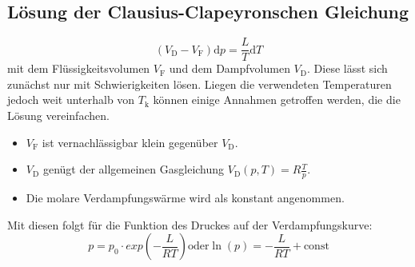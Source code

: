          \subsection{Lösung der Clausius-Clapeyronschen Gleichung}
         \begin{equation}
           (V_\text{D}-V_\text{F})\text{d}p = \frac{L}{T}\text{d}T \label{eq:DGL}
           \end{equation}
           mit dem Flüssigkeitsvolumen $V_\text{F}$ und dem Dampfvolumen $V_\text{D}$.
Diese lässt sich zunächst nur mit Schwierigkeiten lösen.
Liegen die verwendeten Temperaturen jedoch weit unterhalb von $T_\text{k}$ können
 einige Annahmen getroffen werden, die die Lösung vereinfachen.
\begin{itemize}
  \item $V_\text{F}$ ist vernachlässigbar klein gegenüber $V_\text{D}$.
  \item $V_\text{D}$ genügt der allgemeinen Gasgleichung $V_\text{D}(p,T) = R\frac{T}{p}$.
  \item Die molare Verdampfungswärme wird als konstant angenommen.
\end{itemize}
Mit diesen folgt für die Funktion des Druckes auf der Verdampfungskurve:
\begin{equation}
  p = p_0 \cdot exp \left(-\frac{L}{RT}\right) \label{eq:DGLLs} \text{oder} \ln(p) = -\frac{L}{RT}+ \text{const} 
\end{equation}
